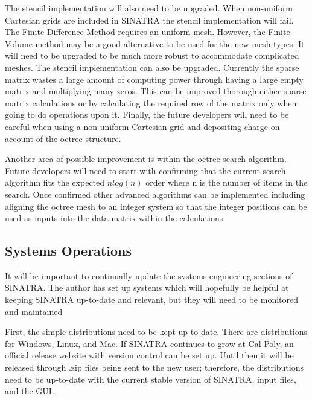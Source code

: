 \indent The stencil implementation will also need to be upgraded. When non-uniform Cartesian grids are included in SINATRA the stencil implementation will fail. The Finite Difference Method requires an uniform mesh. However, the Finite Volume method may be a good alternative to be used for the new mesh types. It will need to be upgraded to be much more robust to accommodate complicated meshes. The stencil implementation can also be upgraded. Currently the sparse matrix wastes a large amount of computing power through having a large empty matrix and multiplying many zeros. This can be improved thorough either sparse matrix calculations or by calculating the required row of the matrix only when going to do operations upon it. Finally, the future developers will need to be careful when using a non-uniform Cartesian grid and depositing charge on account of the octree structure. \par

\indent Another area of possible improvement is within the octree search algorithm. Future developers will need to start with confirming that the current search algorithm fits the expected \(n log(n)\) order where n is the number of items in the search. Once confirmed other advanced algorithms can be implemented including aligning the octree mesh to an integer system so that the integer positions can be used as inputs into the data matrix within the calculations. \par

\subsection{Systems Operations}

It will be important to continually update the systems engineering sections of SINATRA. The author has set up systems which will hopefully be helpful at keeping SINATRA up-to-date and relevant, but they will need to be monitored and maintained
 \par

\indent First, the simple distributions need to be kept up-to-date. There are distributions for Windows, Linux, and Mac. If SINATRA continues to grow at Cal Poly, an official release website with version control can be set up. Until then it will be released through .zip files being sent to the new user; therefore, the distributions need to be up-to-date with the current stable version of SINATRA, input files, and the GUI. \par

